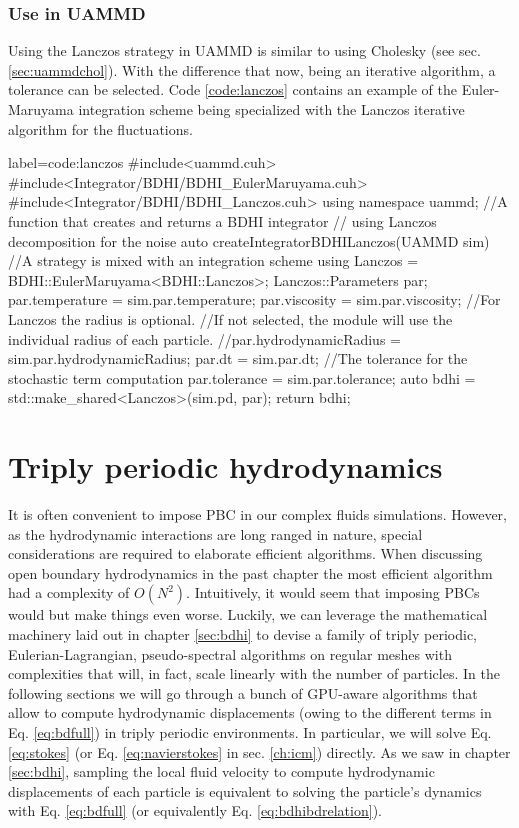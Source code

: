 \documentclass[twoside,openright,titlepage,numbers=noenddot,%
headinclude,footinclude,cleardoublepage=empty,abstract=on,
BCOR=5mm,fontsize=11pt, dvipsnames, paper=b5
]{scrreprt}
\newcommand{\uammd}{\gls{UAMMD}\xspace}
\begin{document}
\subsection*{Use in UAMMD}
Using the Lanczos strategy in \uammd is similar to using Cholesky (see sec. \ref{sec:uammdchol}). With the difference that now, being an iterative algorithm, a tolerance can be selected.
Code \ref{code:lanczos} contains an example of the Euler-Maruyama integration scheme being specialized with the Lanczos iterative algorithm for the fluctuations.
\begin{code2}    {label=code:lanczos}
#include<uammd.cuh>
#include<Integrator/BDHI/BDHI_EulerMaruyama.cuh>
#include<Integrator/BDHI/BDHI_Lanczos.cuh>
using namespace uammd;
//A function that creates and returns a BDHI integrator
// using Lanczos decomposition for the noise
auto createIntegratorBDHILanczos(UAMMD sim){   
  //A strategy is mixed with an integration scheme
  using Lanczos = BDHI::EulerMaruyama<BDHI::Lanczos>;
  Lanczos::Parameters par;
  par.temperature = sim.par.temperature;
  par.viscosity = sim.par.viscosity;
  //For Lanczos the radius is optional.
  //If not selected, the module will use the individual radius of each particle.
  //par.hydrodynamicRadius = sim.par.hydrodynamicRadius;
  par.dt = sim.par.dt;
  //The tolerance for the stochastic term computation
  par.tolerance = sim.par.tolerance;
  auto bdhi = std::make_shared<Lanczos>(sim.pd, par);
  return bdhi;
}
\end{code2}

\newpage
\chapter{Triply periodic hydrodynamics}
It is often convenient to impose \gls{PBC} in our complex fluids simulations. However, as the hydrodynamic interactions are long ranged in nature, special considerations are required to elaborate efficient algorithms. When discussing open boundary hydrodynamics in the past chapter the most efficient algorithm had a complexity of $O(N^2)$. Intuitively, it would seem that imposing \glspl{PBC} would but make things even worse. Luckily, we can leverage the mathematical machinery laid out in chapter \ref{sec:bdhi} to devise a family of triply periodic, Eulerian-Lagrangian, pseudo-spectral algorithms on regular meshes with complexities that will, in fact, scale linearly with the number of particles. In the following sections we will go through a bunch of GPU-aware algorithms that allow to compute hydrodynamic displacements (owing to the different terms in Eq. \eqref{eq:bdfull}) in triply periodic environments. In particular, we will solve Eq. \eqref{eq:stokes} (or Eq. \eqref{eq:navierstokes} in sec. \ref{ch:icm}) directly. As we saw in chapter \ref{sec:bdhi}, sampling the local fluid velocity to compute hydrodynamic displacements of each particle is equivalent to solving the particle's dynamics with Eq. \eqref{eq:bdfull} (or equivalently Eq. \eqref{eq:bdhibdrelation}).
\end{document}

